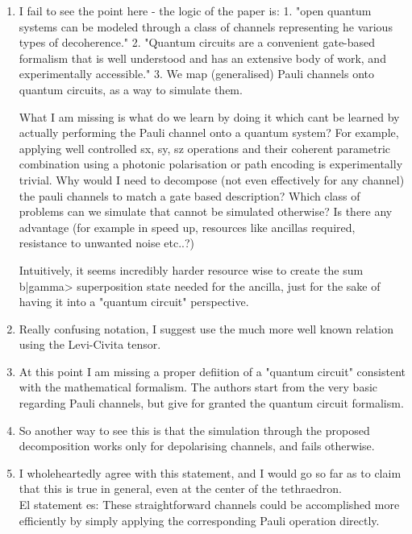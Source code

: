 \documentclass[10pt,letterpaper]{article} %
\begin{document}
\begin{enumerate}
\item I fail to see the point here - the logic of the paper is: 
1. "open quantum systems can be modeled through a class of channels representing he various types of decoherence." 2. "Quantum circuits are a convenient gate-based formalism that is well understood and has an extensive body of work, and experimentally accessible."
3. We map (generalised) Pauli channels onto quantum circuits, as a way to simulate them.

What I am missing is what do we learn by doing it which cant be learned by actually performing the Pauli channel onto a quantum system? For example, applying well controlled sx, sy, sz operations and their coherent parametric combination using a photonic polarisation or path encoding is experimentally trivial. Why would I need to decompose (not even effectively for any channel) the pauli channels to match a gate based description? Which class of problems can we simulate that cannot be simulated otherwise? Is there any advantage (for example in speed up, resources like ancillas required, resistance to unwanted noise etc..?)

Intuitively, it seems incredibly harder resource wise to create the sum b|gamma> superposition state needed for the ancilla, just for the sake of having it into a "quantum circuit" perspective.

\item Really confusing notation, I suggest use the much more well known relation using the Levi-Civita tensor.

\item At this point I am missing a proper defiition of a "quantum circuit" consistent with the mathematical formalism. The authors start from the very basic regarding Pauli channels, but give for granted the quantum circuit formalism.

\item So another way to see this is that the simulation through the proposed decomposition works only for depolarising channels, and fails otherwise. 

\item I wholeheartedly agree with this statement, and I would go so far as to claim that this is true in general, even at the center of the tethraedron. \\

El statement es: These straightforward channels could be accomplished more efficiently by
simply applying the corresponding Pauli operation directly. \\


\end{enumerate}
\end{document}
